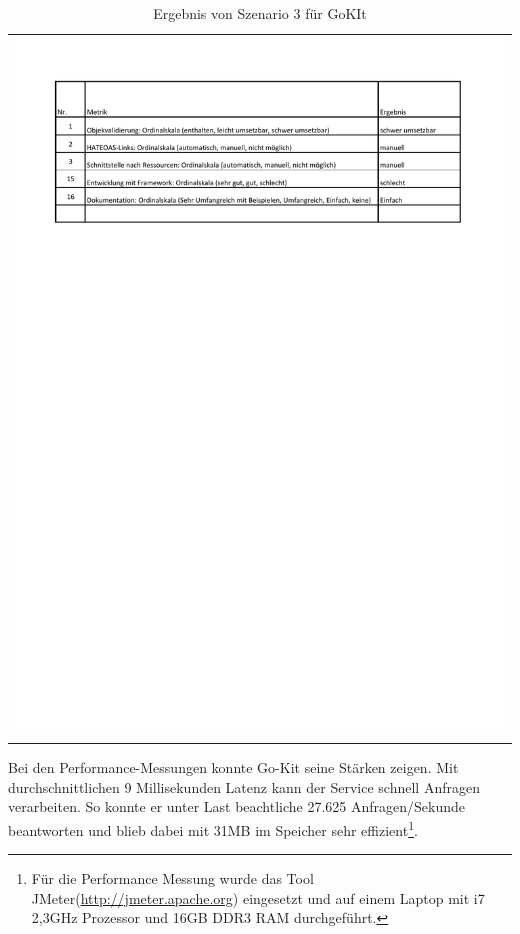 \begin{longtable}{c}
	\includegraphics[width=\linewidth]{Bilder/Sz3ErgebnisGokit.pdf} \\	
	\caption[Szenario 3 Ergebnis GoKit]{Ergebnis von Szenario 3 für GoKIt}
	\label{Sz3ErgebnisGokit}\\
\end{longtable}
\FloatBarrier  

Bei den Performance-Messungen konnte Go-Kit seine Stärken zeigen. Mit durchschnittlichen 9 Millisekunden Latenz kann der Service schnell Anfragen verarbeiten. So konnte er unter Last beachtliche 27.625 Anfragen/Sekunde beantworten und blieb dabei mit 31MB im Speicher sehr effizient\footnote{Für die Performance Messung wurde das Tool JMeter(\url{http://jmeter.apache.org}) eingesetzt und auf einem Laptop mit i7 2,3GHz Prozessor und 16GB DDR3 RAM durchgeführt.}.

